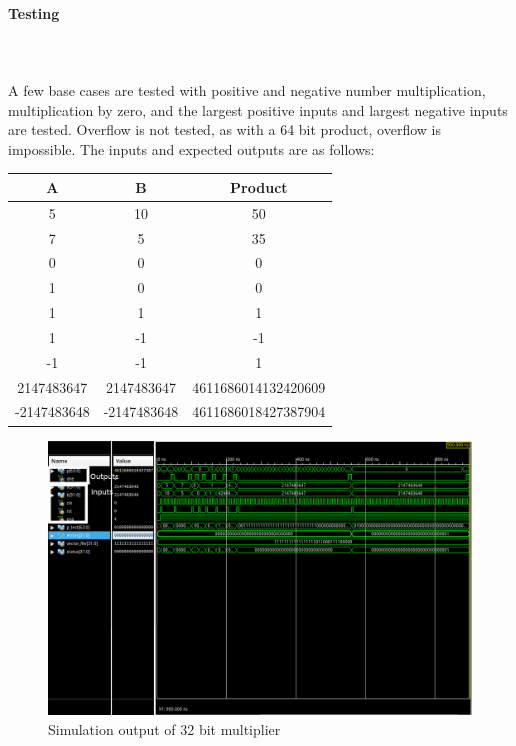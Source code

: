 \documentclass{article}
\begin{document}
    \paragraph{Testing}
    \hfill\\\\
    A few base cases are tested with positive and negative number
    multiplication, multiplication by zero, and the largest positive
    inputs and largest negative inputs are tested. Overflow is not tested,
    as with a 64 bit product, overflow is impossible. The inputs and expected
    outputs are as follows:

    \begin{center}
        \begin{tabular}{|c|c||c|}
            \hline
            A & B & Product
            \\\hline\hline
            5 & 10 & 50
            \\\hline
            7 & 5 & 35
            \\\hline
            0 & 0 & 0
            \\\hline
            1 & 0 & 0
            \\\hline
            1 & 1 & 1
            \\\hline
            1 & -1 & -1
            \\\hline
            -1 & -1 & 1
            \\\hline
            2147483647 & 2147483647 & 4611686014132420609
            \\\hline
            -2147483648 & -2147483648 & 4611686018427387904
            \\\hline
        \end{tabular}
    \end{center}


    \begin{figure}[H]
        \centering
        \includegraphics[width=0.9\paperwidth,center]{Screenshots/multiplier_32.png}
        \caption{Simulation output of 32 bit multiplier}
    \end{figure}
\end{document}
